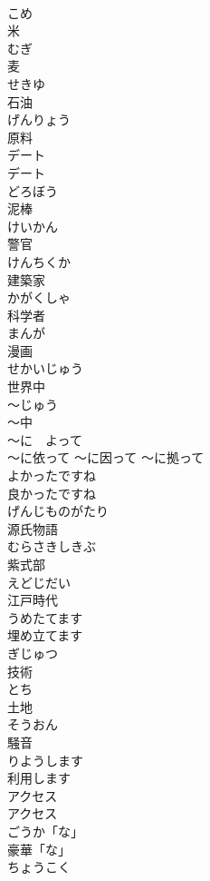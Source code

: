 \documentclass[8pt]{extreport}
\begin{document}
\begin{CJK}{UTF8}{min}
\\	こめ	
\\	米	
\\	むぎ	
\\	麦	
\\	せきゆ	
\\	石油	
\\	げんりょう	
\\	原料		
\\	デート	
\\	デート		
\\	どろぼう	
\\	泥棒	
\\	けいかん	
\\	警官		
\\	けんちくか	
\\	建築家		
\\	かがくしゃ	
\\	科学者	
\\	まんが	
\\	漫画		
\\	せかいじゅう	
\\	世界中	
\\	〜じゅう	
\\	〜中		
\\	〜に　よって	
\\	〜に依って 〜に因って 〜に拠って		
\\	よかったですね	
\\	良かったですね		
\\	げんじものがたり	
\\	源氏物語		
\\	むらさきしきぶ	
\\	紫式部		
\\	えどじだい	
\\	江戸時代		
\\	うめたてます	
\\	埋め立てます		
\\	ぎじゅつ	
\\	技術		
\\	とち	
\\	土地		
\\	そうおん	
\\	騒音		
\\	りようします	
\\	利用します	
\\	アクセス	
\\	アクセス		
\\	ごうか「な」	
\\	豪華「な」		
\\	ちょうこく	

\end{CJK}
\end{document}
